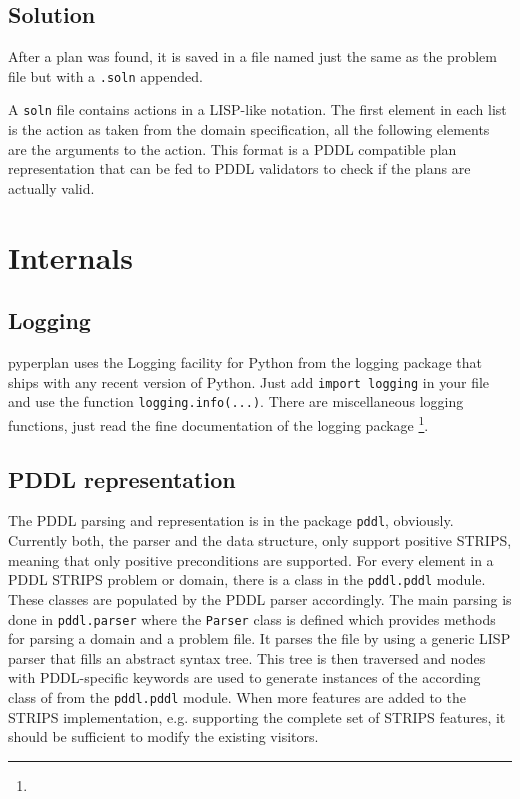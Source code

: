 \documentclass{article}
\begin{document}
\hypertarget{toc3}{}
\subsection{Solution}

After a plan was found, it is saved in a file named just the same as the problem
file but with a \texttt{.soln} appended.

A \texttt{soln} file contains actions in a LISP-like notation. The first element
in each list is the action as taken from the domain specification, all the
following elements are the arguments to the action. This format is a
PDDL compatible plan representation that can be fed to PDDL validators to check
if the plans are actually valid.


\hypertarget{toc4}{}
\section{Internals}

\hypertarget{toc5}{}
\subsection{Logging}

pyperplan uses the Logging facility for Python from the logging package that
ships with any recent version of Python.
Just add \texttt{import logging} in your file and use the function
\texttt{logging.info(...)}.
There are miscellaneous logging functions, just read the fine documentation
of the logging package \footnote{}.

\hypertarget{toc6}{}
\subsection{PDDL representation}

The PDDL parsing and representation is in the package \texttt{pddl}, obviously.
Currently both, the parser and the data structure, only support positive STRIPS,
meaning that only positive preconditions are supported. For every element in a
PDDL STRIPS problem or domain, there is a class in the \texttt{pddl.pddl} module.
These classes are populated by the PDDL parser accordingly. The main parsing
is done in \texttt{pddl.parser} where the \texttt{Parser} class is defined which provides
methods for parsing a domain and a problem file. It parses the file by
using a generic LISP parser that fills an abstract syntax tree. This tree is
then traversed and nodes with PDDL-specific keywords are used to generate
instances of the according class of from the \texttt{pddl.pddl} module. When
more features are added to the STRIPS implementation, e.g. supporting the
complete set of STRIPS features, it should be sufficient to modify the existing
visitors.
\end{document}
